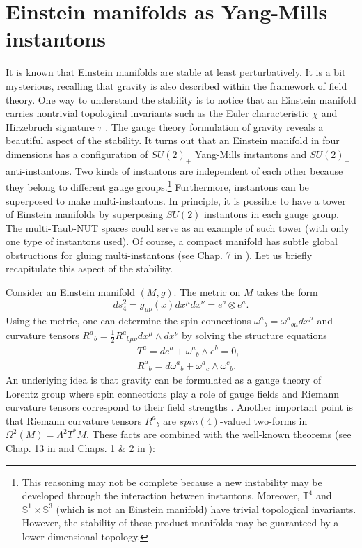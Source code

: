 \documentclass[12pt,epsf]{article}
\begin{document}
\section{Einstein manifolds as Yang-Mills instantons}



It is known \cite{eins-stable1,eins-stable2} that Einstein manifolds are stable at least perturbatively.
It is a bit mysterious, recalling that gravity is also described within the framework of field theory.
One way to understand the stability is to notice that an Einstein manifold carries nontrivial topological invariants
such as the Euler characteristic $\chi$ and Hirzebruch signature $\tau$ \cite{egh-report}.
The gauge theory formulation of gravity reveals a beautiful aspect of the stability.
It turns out \cite{oh-yang,joy-jhep} that an Einstein manifold in four dimensions has a configuration
of $SU(2)_+$ Yang-Mills instantons and $SU(2)_-$ anti-instantons.
Two kinds of instantons are independent of each other because they belong
to different gauge groups.\footnote{This reasoning may not be complete because a new instability may be
developed through the interaction between instantons.
Moreover, $\mathbb{T}^4$ and $\mathbb{S}^1 \times \mathbb{S}^3$ (which is not an Einstein manifold)
have trivial topological invariants.
However, the stability of these product manifolds may be guaranteed by a lower-dimensional topology.}
Furthermore, instantons can be superposed to make multi-instantons.
In principle, it is possible to have a tower of Einstein manifolds by superposing $SU(2)$ instantons
in each gauge group. The multi-Taub-NUT spaces \cite{euc-bh} could serve as an example of such tower
(with only one type of instantons used).
Of course, a compact manifold has subtle global obstructions
for gluing multi-instantons (see Chap. 7 in \cite{book-dokr}).
Let us briefly recapitulate this aspect of the stability.




Consider an Einstein manifold $(M,g)$. The metric on $M$ takes the form
\begin{equation}\label{4-metric}
  ds_4^2 = g_{\mu\nu} (x) dx^\mu dx^\nu = e^a \otimes e^a.
\end{equation}
Using the metric, one can determine the spin connections ${\omega^a}_{b} = {\omega^a}_{b \mu} dx^\mu$
and curvature tensors ${R^a}_{b} = \frac{1}{2} {R^a}_{b \mu \nu} dx^\mu \wedge dx^\nu$
by solving the structure equations \cite{egh-report,nakahara}
\begin{eqnarray} \label{t-free}
  &&  T^a = de^a + {\omega^a}_{b} \wedge e^b =0, \\
  \label{curv-eq}
  && {R^a}_{b} = d {\omega^a}_{b} + {\omega^a}_{c} \wedge {\omega^c}_{b}.
\end{eqnarray}
An underlying idea is that gravity can be formulated as a gauge theory of Lorentz group where
spin connections play a role of gauge fields and Riemann curvature tensors correspond to their field
strengths \cite{utiyama}. Another important point is that Riemann curvature tensors ${R^a}_{b}$ are $spin(4)$-valued
two-forms in $\Omega^2 (M) = \Lambda^2 T^* M$. These facts are combined
with the well-known theorems (see Chap. 13 in \cite{book-besse} and Chaps. 1 \& 2 in \cite{book-dokr}):
\end{document}
